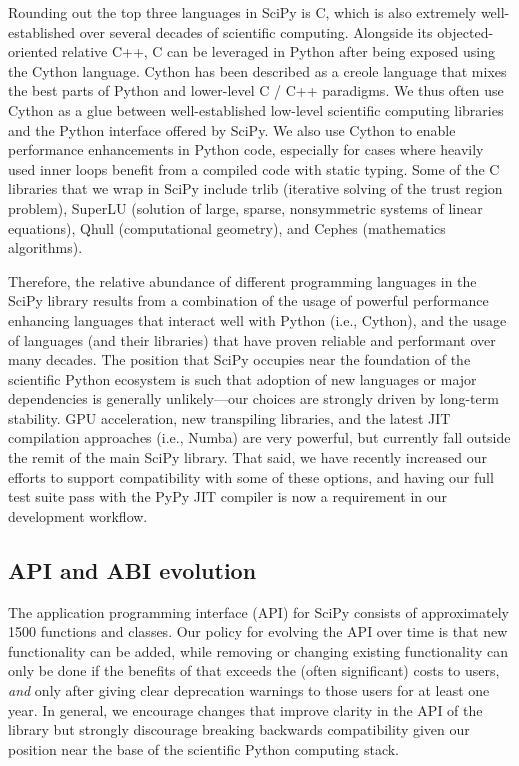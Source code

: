 \documentclass[fleqn,10pt]{wlscirep}
\begin{document}
Rounding out the top three languages in SciPy is C, which is also extremely
well-established over several decades\cite{Kernighan:1988:CPL:576122} of
scientific computing. Alongside its objected-oriented relative C++, C can be
leveraged in Python after being exposed using the Cython language. Cython has
been described as a creole language that mixes the best parts of Python and
lower-level C / C++ paradigms\cite{behnel2011cython}. We thus often use Cython
as a glue between well-established low-level scientific computing libraries and
the Python interface offered by SciPy. We also use Cython to enable performance
enhancements in Python code, especially for cases where heavily used inner
loops benefit from a compiled code with static typing. Some of the C libraries
that we wrap in SciPy include trlib\cite{doi:10.1080/10556788.2018.1449842}
(iterative solving of the trust region problem),
SuperLU\cite{li05,superlu_ug99} (solution of large, sparse, nonsymmetric
systems of linear equations), Qhull\cite{Barber:1996:QAC:235815.235821}
(computational geometry), and Cephes\cite{cephes_netlib} (mathematics
algorithms). 

Therefore, the relative abundance of different programming languages in the
SciPy library results from a combination of the usage of powerful performance
enhancing languages that interact well with Python (i.e., Cython), and the
usage of languages (and their libraries) that have proven reliable and
performant over many decades. The position that SciPy occupies near the
foundation of the scientific Python ecosystem is such that adoption of new
languages or major dependencies is generally unlikely---our choices are strongly
driven by long-term stability. GPU acceleration, new transpiling libraries, and
the latest JIT compilation approaches (i.e.,
Numba\cite{Lam:2015:NLP:2833157.2833162}) are very powerful, but currently fall
outside the remit of the main SciPy library. That said, we have recently
increased our efforts to support compatibility with some of these options, and
having our full test suite pass with the PyPy JIT
compiler\cite{Bolz:2009:TMP:1565824.1565827} is now a requirement in our
development workflow.

\subsection*{API and ABI evolution}

The application programming interface (API) for SciPy consists of approximately
1500 functions and classes.  Our policy for evolving the API over time is that
new functionality can be added, while removing or changing existing
functionality can only be done if the benefits of that exceeds the (often
significant) costs to users, \textit{and} only after giving clear deprecation
warnings to those users for at least one year. In general, we encourage
changes that improve clarity in the API of the library but strongly discourage
breaking backwards compatibility given our position near the base of the 
scientific Python computing stack.
\end{document}
